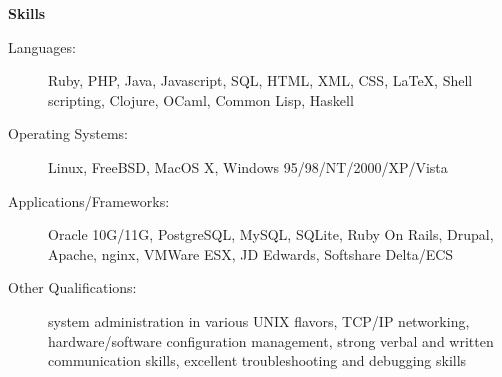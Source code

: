 \documentclass[11pt]{article}
\begin{document}
{\large \textbf{Skills}}

\begin{description}
\item[Languages:]
  Ruby, PHP, Java, Javascript, SQL, HTML, XML, CSS, \LaTeX, Shell scripting, Clojure, OCaml, Common Lisp, Haskell
\item[Operating Systems:]
  Linux, FreeBSD, MacOS X, Windows 95/98/NT/2000/XP/Vista
\item[Applications/Frameworks:]
  Oracle 10G/11G, PostgreSQL, MySQL, SQLite, Ruby On Rails, Drupal, Apache, nginx, VMWare ESX, JD Edwards, Softshare Delta/ECS
\item[Other Qualifications:]
  system administration in various UNIX flavors, TCP/IP networking, hardware/software configuration management, strong verbal and written communication skills, excellent troubleshooting and debugging skills
\end{description}
\end{document}
